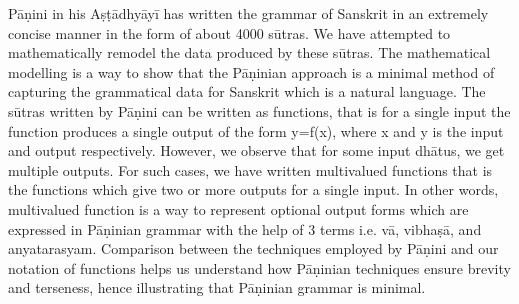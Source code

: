 \renewcommand{\thepage}{\roman{page}} \setcounter{page}{1}
Pāṇini in his Aṣṭādhyāyī has written the grammar of Sanskrit in an extremely concise manner in the form of about 4000 sūtras. We have attempted to mathematically remodel the data produced by these sūtras. The mathematical modelling is a way to show that the Pāṇinian approach is a minimal method of capturing the grammatical data for Sanskrit which is a natural language. The sūtras written by Pāṇini can be written as functions, that is for a single input the function produces a single output of the form y=f(x), where x and y is the input and output respectively. However, we observe that for some input dhātus, we get multiple outputs. For such cases, we have written multivalued functions that is the functions which give two or more outputs for a single input. In other words, multivalued function is a way to represent optional output forms which are expressed in Pāṇinian grammar with the help of 3 terms i.e. vā, vibhaṣā, and anyatarasyam. Comparison between the techniques employed by Pāṇini and our notation of functions helps us understand how Pāṇinian techniques ensure brevity and terseness, hence illustrating that Pāṇinian grammar is minimal.